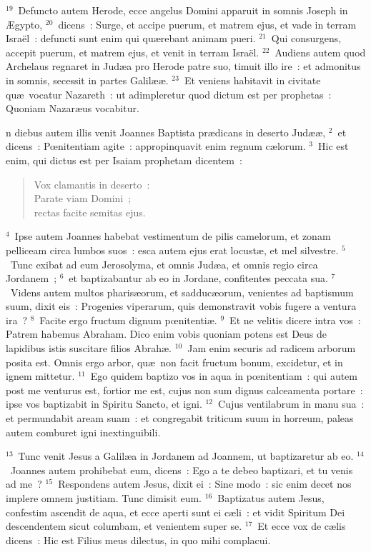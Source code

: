 ${}^{19}$~Defuncto autem Herode, ecce angelus Domini apparuit in somnis Joseph in \AE gypto,
${}^{20}$~dicens~: Surge, et accipe puerum, et matrem ejus, et vade in terram Isra\"el~: defuncti sunt enim qui qu\ae rebant animam pueri.
${}^{21}$~Qui consurgens, accepit puerum, et matrem ejus, et venit in terram Isra\"el.
${}^{22}$~Audiens autem quod Archelaus regnaret in Jud\ae a pro Herode patre suo, timuit illo ire~: et admonitus in somnis, secessit in partes Galil\ae \ae .
${}^{23}$~Et veniens habitavit in civitate qu\ae\ vocatur Nazareth~: ut adimpleretur quod dictum est per prophetas~: Quoniam Nazar\ae us vocabitur.

\bchapter
{}n diebus autem illis venit Joannes Baptista pr\ae dicans in deserto Jud\ae \ae ,
${}^{2}$~et dicens~: Pœnitentiam agite~: appropinquavit enim regnum c\ae lorum.
${}^{3}$~Hic est enim, qui dictus est per Isaiam prophetam dicentem~: \begin{flushleft}\begin{verse}Vox clamantis in deserto~:\\ Parate viam Domini~;\\ rectas facite semitas ejus.\end{verse}\end{flushleft}


${}^{4}$~Ipse autem Joannes habebat vestimentum de pilis camelorum, et zonam pelliceam circa lumbos suos~: esca autem ejus erat locust\ae , et mel silvestre.
${}^{5}$~Tunc exibat ad eum Jerosolyma, et omnis Jud\ae a, et omnis regio circa Jordanem~;
${}^{6}$~et baptizabantur ab eo in Jordane, confitentes peccata sua.
${}^{7}$~Videns autem multos pharis\ae orum, et sadduc\ae orum, venientes ad baptismum suum, dixit eis~: Progenies viperarum, quis demonstravit vobis fugere a ventura ira~?
${}^{8}$~Facite ergo fructum dignum pœnitenti\ae .
${}^{9}$~Et ne velitis dicere intra vos~: Patrem habemus Abraham. Dico enim vobis quoniam potens est Deus de lapidibus istis suscitare filios Abrah\ae .
${}^{10}$~Jam enim securis ad radicem arborum posita est. Omnis ergo arbor, qu\ae\ non facit fructum bonum, excidetur, et in ignem mittetur.
${}^{11}$~Ego quidem baptizo vos in aqua in pœnitentiam~: qui autem post me venturus est, fortior me est, cujus non sum dignus calceamenta portare~: ipse vos baptizabit in Spiritu Sancto, et igni.
${}^{12}$~Cujus ventilabrum in manu sua~: et permundabit aream suam~: et congregabit triticum suum in horreum, paleas autem comburet igni inextinguibili.


${}^{13}$~Tunc venit Jesus a Galil\ae a in Jordanem ad Joannem, ut baptizaretur ab eo.
${}^{14}$~Joannes autem prohibebat eum, dicens~: Ego a te debeo baptizari, et tu venis ad me~?
${}^{15}$~Respondens autem Jesus, dixit ei~: Sine modo~: sic enim decet nos implere omnem justitiam. Tunc dimisit eum.
${}^{16}$~Baptizatus autem Jesus, confestim ascendit de aqua, et ecce aperti sunt ei c\ae li~: et vidit Spiritum Dei descendentem sicut columbam, et venientem super se.
${}^{17}$~Et ecce vox de c\ae lis dicens~: Hic est Filius meus dilectus, in quo mihi complacui.

